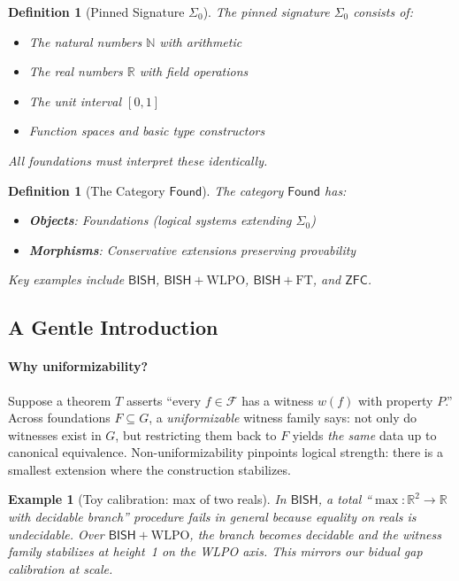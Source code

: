 \documentclass[11pt]{article}
\newtheorem{definition}[theorem]{Definition}
\newtheorem{example}[theorem]{Example}
\newcommand{\N}{\mathbb{N}}
\newcommand{\R}{\mathbb{R}}
\newcommand{\WLPO}{\mathrm{WLPO}}
\newcommand{\FT}{\mathrm{FT}}
\newcommand{\BISH}{\mathsf{BISH}}
\newcommand{\ZFC}{\mathsf{ZFC}}
\newcommand{\Found}{\mathsf{Found}}
\newcommand{\SigmaZero}{\Sigma_{0}}
\begin{document}
\begin{definition}[Pinned Signature $\SigmaZero$]
The \emph{pinned signature} $\SigmaZero$ consists of:
\begin{itemize}
\item The natural numbers $\N$ with arithmetic
\item The real numbers $\R$ with field operations
\item The unit interval $[0,1]$
\item Function spaces and basic type constructors
\end{itemize}
All foundations must interpret these identically.
\end{definition}

\begin{definition}[The Category $\Found$]
The category $\Found$ has:
\begin{itemize}
\item \textbf{Objects}: Foundations (logical systems extending $\SigmaZero$)
\item \textbf{Morphisms}: Conservative extensions preserving provability
\end{itemize}
Key examples include $\BISH$, $\BISH + \WLPO$, $\BISH + \FT$, and $\ZFC$.
\end{definition}

\subsection{A Gentle Introduction}\label{subsec:gently}

\paragraph{Why uniformizability?}
Suppose a theorem $T$ asserts ``every $f\in\mathcal{F}$ has a witness $w(f)$ with property $P$.''
Across foundations $F\subseteq G$, a \emph{uniformizable} witness family says:
not only do witnesses exist in $G$, but restricting them back to $F$ yields \emph{the same} data up to canonical equivalence. Non-uniformizability pinpoints logical strength: there is a smallest extension where the construction stabilizes.

\begin{example}[Toy calibration: max of two reals]
In $\BISH$, a total ``$\max:\R^2\to\R$ with decidable branch'' procedure fails in general because equality on reals is undecidable. Over $\BISH+\WLPO$, the branch becomes decidable and the witness family stabilizes at height~1 on the WLPO axis. This mirrors our bidual gap calibration at scale.
\end{example}
\end{document}
